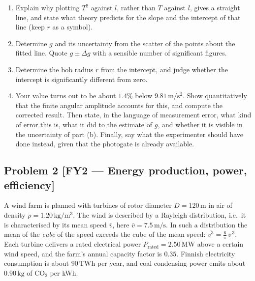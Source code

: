 \documentclass[11pt,a4paper]{article}
\newcommand{\problem}[3]{%
  \subsection*{Problem #1 \;\textnormal{\small[#2]}}\label{prob:#3}%
}
\newcommand{\unit}[1]{\,\mathrm{#1}}
\newenvironment{parts}{\begin{enumerate}[label=\textbf{\alph*)}]}{\end{enumerate}}
\begin{document}
\begin{parts}
\item Explain why plotting $T^2$ against $l$, rather than $T$ against $l$,
      gives a straight line, and state what theory predicts for the slope and
      the intercept of that line (keep $r$ as a symbol).
\item Determine $g$ and its uncertainty from the scatter of the points about
      the fitted line. Quote $g\pm\Delta g$ with a sensible number of
      significant figures.
\item Determine the bob radius $r$ from the intercept, and judge whether the
      intercept is significantly different from zero.
\item Your value turns out to be about $1.4\%$ below $9.81\unit{m/s^2}$. Show
      quantitatively that the finite angular amplitude accounts for this, and
      compute the corrected result. Then state, in the language of
      measurement error, what kind of error this is, what it did to the
      estimate of $g$, and whether it is visible in the uncertainty of
      part (b). Finally, say what the experimenter should have done instead,
      given that the photogate is already available.
\end{parts}

\problem{2}{FY2 --- Energy production, power, efficiency}{fy2}

A wind farm is planned with turbines of rotor diameter $D=120\unit{m}$ in air
of density $\rho=1.20\unit{kg/m^3}$. The wind is described by a Rayleigh
distribution, i.e.\ it is characterised by its mean speed $\bar v$, here
$\bar v=7.5\unit{m/s}$. In such a distribution the mean of the \emph{cube} of
the speed exceeds the cube of the mean speed:
$\overline{v^3}=\tfrac{6}{\pi}\,\bar v^{\,3}$. Each turbine delivers a rated
electrical power $P_{\text{rated}}=2.50\unit{MW}$ above a certain wind speed,
and the farm's annual capacity factor is $0.35$. Finnish electricity
consumption is about $90\unit{TWh}$ per year, and coal condensing power emits
about $0.90\unit{kg}$ of CO$_2$ per kWh.
\end{document}
